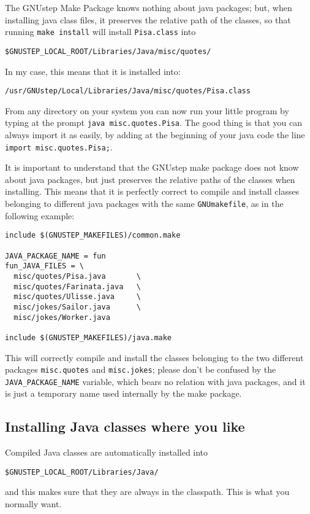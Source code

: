 The GNUstep Make Package knows nothing about java packages; but, when
installing java class files, it preserves the relative path of the
classes, so that running \texttt{make install} will install
\texttt{Pisa.class} into
\begin{verbatim}
$GNUSTEP_LOCAL_ROOT/Libraries/Java/misc/quotes/
\end{verbatim}
In my case, this means that it is installed into:
\begin{verbatim}
/usr/GNUstep/Local/Libraries/Java/misc/quotes/Pisa.class
\end{verbatim}

From any directory on your system you can now run your little program
by typing at the prompt \texttt{java misc.quotes.Pisa}.  The good
thing is that you can always import it as easily, by adding at the
beginning of your java code the line \texttt{import
misc.quotes.Pisa;}.

It is important to understand that the GNUstep make package does not
know about java packages, but just preserves the relative paths of the
classes when installing.  This means that it is perfectly correct to
compile and install classes belonging to different java packages with
the same \texttt{GNUmakefile}, as in the following example:
\begin{verbatim}
include $(GNUSTEP_MAKEFILES)/common.make

JAVA_PACKAGE_NAME = fun
fun_JAVA_FILES = \
  misc/quotes/Pisa.java       \
  misc/quotes/Farinata.java   \
  misc/quotes/Ulisse.java     \
  misc/jokes/Sailor.java      \
  misc/jokes/Worker.java

include $(GNUSTEP_MAKEFILES)/java.make
\end{verbatim}

This will correctly compile and install the classes belonging to the
two different packages \texttt{misc.quotes} and \texttt{misc.jokes};
please don't be confused by the \texttt{JAVA\_PACKAGE\_NAME} variable,
which bears no relation with java packages, and it is just a temporary
name used internally by the make package.

\subsection{Installing Java classes where you like}

Compiled Java classes are automatically installed into
\begin{verbatim}
$GNUSTEP_LOCAL_ROOT/Libraries/Java/
\end{verbatim}
and this makes sure that they are always in the classpath.  This is
what you normally want.

